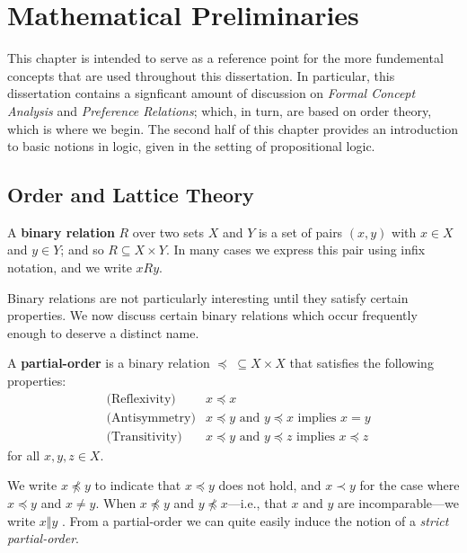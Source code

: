 \chapter{Mathematical Preliminaries}
\label{chapter:mathematical-preliminaries}

This chapter is intended to serve as a reference point for the more fundemental concepts that are used throughout this dissertation. In particular, this dissertation contains a signficant amount of  discussion on \textit{Formal Concept Analysis} and \textit{Preference Relations}; which, in turn, are based on order theory, which is where we begin. The second half of this chapter provides an introduction to basic notions in logic, given in the setting of propositional logic.

\section{Order and Lattice Theory}
\label{section:order-theory}

\begin{definition}
  \label{definition:binary-relation}
  A \textbf{binary relation}  $R$ over two sets $X$ and $Y$ is a set of pairs $(x,y)$ with $x \in X$ and $y \in Y$; and so $R \subseteq X \times Y$. In many cases we express this pair using infix notation, and we write $xRy$.
\end{definition}

Binary relations are not particularly interesting until they satisfy certain properties. We now discuss certain binary relations which occur frequently enough to deserve a distinct name.

\begin{definition}
  \label{definition:partial-order}
  A \textbf{partial-order}  is a binary relation $\preceq \; \subseteq X \times X$ that satisfies the following properties:
  \begin{align}
    & \text{(Reflexivity)} & x \preceq x \\
    & \text{(Antisymmetry)} & x \preceq y \text{ and } y \preceq x \text{ implies } x = y \\
    & \text{(Transitivity)} & x \preceq y \text{ and } y \preceq z \text{ implies } x \preceq z
  \end{align}
  for all $x,y,z \in X$.
\end{definition}

We write $x \npreceq y$ to indicate that $x \preceq y$ does not hold, and $x \prec y$ for the case where $x\preceq y$ and $x \not = y$. When $x \not \preceq y$ and $y \not \preceq x$---i.e., that $x$ and $y$ are incomparable---we write $x \Vert y$ \cite{Davey_Priestley_2002}. From a partial-order we can quite easily induce the notion of a \emph{strict partial-order}.

